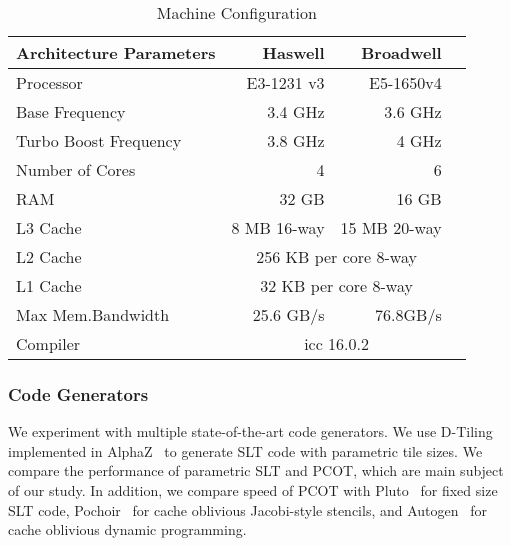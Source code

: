 \begin{table}
\caption{Machine Configuration
\label{tab:machine}}
\centering
\begin{tabular}{|l|r|r|r|}
\hline\hline
 Architecture Parameters &Haswell & Broadwell \\ \hline\hline
 Processor &  E3-1231 v3 & E5-1650v4 \\ \hline
 Base Frequency & 3.4 GHz & 3.6 GHz \\ \hline
 Turbo Boost Frequency & 3.8 GHz & 4 GHz \\ \hline
 Number of Cores &  4 & 6 \\ \hline
 RAM & 32 GB & 16 GB \\ \hline
 L3 Cache &  8 MB 16-way & 15 MB 20-way\\ \hline
 L2 Cache &  \multicolumn{2}{c|}{256 KB per core 8-way} \\ \hline
 L1 Cache &  \multicolumn{2}{c|}{32 KB per core 8-way} \\ \hline
 Max Mem.Bandwidth & 25.6 GB/s & 76.8GB/s \\ \hline
 Compiler & \multicolumn{2}{c|}{icc 16.0.2} \\ \hline
\end{tabular}
\end{table}

\subsubsection{Code Generators}
We experiment with multiple state-of-the-art code generators.  We use
D-Tiling~\cite{sanjay-lcpc2009,sanjay-kim-dtilingTR-2010} implemented in
AlphaZ~\cite{yuki2013alphaz} to generate SLT code with parametric tile sizes.
We compare the performance of parametric SLT and PCOT, which are main subject
of our study. In addition, we compare speed of PCOT with
Pluto~\cite{uday-pldi08} for fixed size SLT code, Pochoir~\cite{Tang2011} for
cache oblivious Jacobi-style stencils, and Autogen~\cite{autogen-ppopp16} for
cache oblivious dynamic programming.


